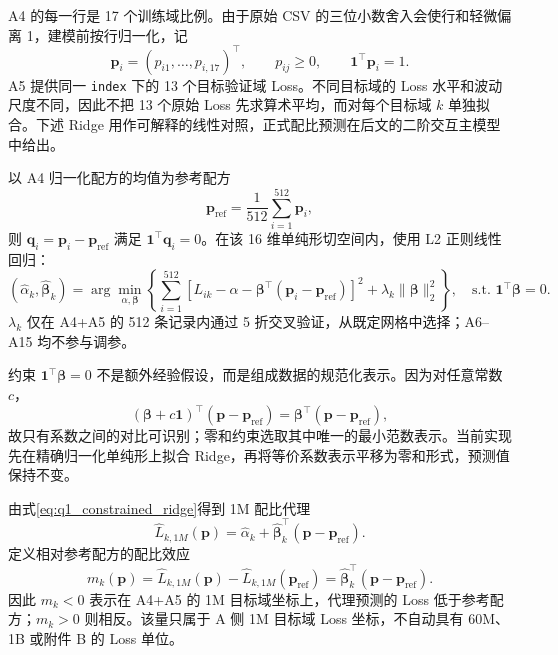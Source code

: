A4 的每一行是 17 个训练域比例。由于原始 CSV 的三位小数舍入会使行和轻微偏离 1，建模前按行归一化，记
\begin{equation}
\boldsymbol p_i=(p_{i1},\ldots,p_{i,17})^\top,
\qquad
p_{ij}\ge 0,\qquad
\boldsymbol 1^\top\boldsymbol p_i=1.
\label{eq:q1_simplex}
\end{equation}
A5 提供同一 \texttt{index} 下的 13 个目标验证域 Loss。不同目标域的 Loss 水平和波动尺度不同，因此不把 13 个原始 Loss 先求算术平均，而对每个目标域 $k$ 单独拟合。下述 Ridge 用作可解释的线性对照，正式配比预测在后文的二阶交互主模型中给出。

以 A4 归一化配方的均值为参考配方
\begin{equation}
\boldsymbol p_{\mathrm{ref}}
=
\frac{1}{512}\sum_{i=1}^{512}\boldsymbol p_i,
\label{eq:q1_pref}
\end{equation}
则 $\boldsymbol q_i=\boldsymbol p_i-\boldsymbol p_{\mathrm{ref}}$ 满足 $\boldsymbol 1^\top\boldsymbol q_i=0$。在该 16 维单纯形切空间内，使用 L2 正则线性回归\cite{regmix2025}：
\begin{equation}
(\widehat\alpha_k,\widehat{\boldsymbol\beta}_k)
=
\arg\min_{\alpha,\boldsymbol\beta}
\left\{
\sum_{i=1}^{512}
\left[
L_{ik}-\alpha-\boldsymbol\beta^\top
(\boldsymbol p_i-\boldsymbol p_{\mathrm{ref}})
\right]^2
+
\lambda_k\|\boldsymbol\beta\|_2^2
\right\},
\quad
\text{s.t. }\boldsymbol 1^\top\boldsymbol\beta=0.
\label{eq:q1_constrained_ridge}
\end{equation}
$\lambda_k$ 仅在 A4+A5 的 512 条记录内通过 5 折交叉验证，从既定网格中选择；A6--A15 均不参与调参。

约束 $\boldsymbol 1^\top\boldsymbol\beta=0$ 不是额外经验假设，而是组成数据的规范化表示。因为对任意常数 $c$，
\[
(\boldsymbol\beta+c\boldsymbol 1)^\top
(\boldsymbol p-\boldsymbol p_{\mathrm{ref}})
=
\boldsymbol\beta^\top
(\boldsymbol p-\boldsymbol p_{\mathrm{ref}}),
\]
故只有系数之间的对比可识别；零和约束选取其中唯一的最小范数表示。当前实现先在精确归一化单纯形上拟合 Ridge，再将等价系数表示平移为零和形式，预测值保持不变。

由式\eqref{eq:q1_constrained_ridge}得到 1M 配比代理
\begin{equation}
\widehat L_{k,1M}(\boldsymbol p)
=
\widehat\alpha_k
+
\widehat{\boldsymbol\beta}_k^\top
(\boldsymbol p-\boldsymbol p_{\mathrm{ref}}).
\label{eq:q1_1m_surrogate}
\end{equation}
定义相对参考配方的配比效应
\begin{equation}
m_k(\boldsymbol p)
=
\widehat L_{k,1M}(\boldsymbol p)
-
\widehat L_{k,1M}(\boldsymbol p_{\mathrm{ref}})
=
\widehat{\boldsymbol\beta}_k^\top
(\boldsymbol p-\boldsymbol p_{\mathrm{ref}}).
\label{eq:q1_centered_effect}
\end{equation}
因此 $m_k<0$ 表示在 A4+A5 的 1M 目标域坐标上，代理预测的 Loss 低于参考配方；$m_k>0$ 则相反。该量只属于 A 侧 1M 目标域 Loss 坐标，不自动具有 60M、1B 或附件 B 的 Loss 单位。

